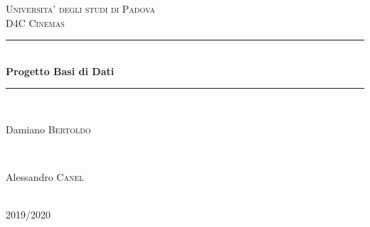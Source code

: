 \documentclass[10pt]{article}
\begin{document}
	
	\begin{titlepage} %
		\newcommand{\HRule}{\rule{\linewidth}{0.5mm}} %
		
		\center %
		
		
		\textsc{\LARGE Universita' degli studi di Padova}\\[1.5cm] %
		
		\textsc{\Large D4C Cinemas}\\[0.5cm] %
		
		
		
		\HRule\\[0.4cm]
		
		{\huge\bfseries Progetto Basi di Dati}\\[0.2cm] %
		
		\HRule\\[1.5cm]
		
		
		\begin{minipage}{0.4\textwidth}
			\begin{flushleft}
				\large
				Damiano \textsc{Bertoldo} %
			\end{flushleft}
		\end{minipage}
		~
		\begin{minipage}{0.4\textwidth}
			\begin{flushright}
				\large
				Alessandro \textsc{Canel} %
			\end{flushright}
		\end{minipage}
		
		{\large\textit{}}\\
		\textsc{2019/2020} %
		
		

\end{titlepage}
\end{document}
